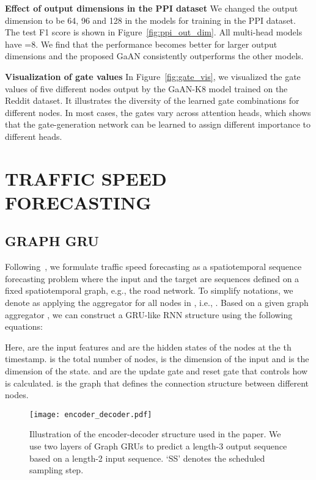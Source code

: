 \documentclass{article}
\begin{document}
	\textbf{Effect of output dimensions in the PPI dataset}\quad
	We changed the output dimension to be 64, 96 and 128 in the models for training in the PPI dataset. The test F1 score is shown in Figure~\ref{fig:ppi_out_dim}. All multi-head models have =8. We find that the performance becomes better for larger output dimensions and the proposed GaAN consistently outperforms the other models.
	
	\textbf{Visualization of gate values}\quad
	In Figure~\ref{fig:gate_vis}, we visualized the gate values of five different nodes output by the GaAN-K8 model trained on the Reddit dataset. It illustrates the diversity of the learned gate combinations for different nodes. In most cases, the gates vary across attention heads, which shows that the gate-generation network can be learned to assign different importance to different heads.


	
	
	\section{TRAFFIC SPEED FORECASTING}
\subsection{GRAPH GRU}
	Following~\citep{lin2017structured}, we formulate traffic speed forecasting as a spatiotemporal sequence forecasting problem where the input and the target are sequences defined on a fixed spatiotemporal graph, e.g., the road network. To simplify notations, we denote  as applying the  aggregator for all nodes in , i.e., . Based on a given graph aggregator , we can construct a GRU-like RNN structure using the following equations:
	
	Here,  are the input features and  are the hidden states of the nodes at the th timestamp.  is the total number of nodes,  is the dimension of the input and  is the dimension of the state.  and  are the update gate and reset gate that controls how  is calculated.  is the graph that defines the connection structure between different nodes.
	
	\begin{figure}[bt!]
		\centering
		\texttt{[image: encoder\_decoder.pdf]}
		\caption{Illustration of the encoder-decoder structure used in the paper. We use two layers of Graph GRUs to predict a length-3 output sequence based on a length-2 input sequence. `SS' denotes the scheduled sampling step.}
		\label{fig:encoder_decoder}
\end{figure}
	
\end{document}
